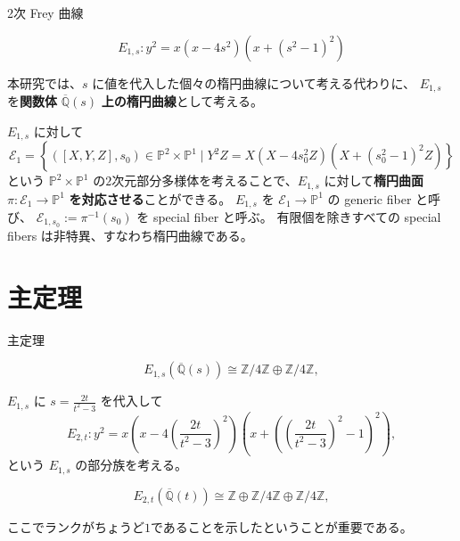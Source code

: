 \documentclass{classes/mybeamer}
\begin{document}
\begin{frame}{2次 Frey 曲線}
    \begin{eg*}
        \begin{equation*}
            E_{1,s}: y^{2} = x(x - 4s^{2})(x + (s^{2} - 1)^{2})
        \end{equation*}
    \end{eg*}
    本研究では、$s$ に値を代入した個々の楕円曲線について考える代わりに、 $E_{1,s}$ を\textbf{関数体} $\overline{\mathbb{Q}}(s)$ \textbf{上の楕円曲線}として考える。
    \vspace{1cm}

    $E_{1,s}$ に対して
    \begin{equation*}
        \mathcal{E}_{1} = \left\{ ([X,Y,Z],s_0) \in \mathbb{P}^{2} \times \mathbb{P}^{1} \mid Y^{2}Z = X(X - 4s_{0}^{2}Z)(X + (s_{0}^{2} - 1)^{2}Z) \right\}
    \end{equation*}
    という $\mathbb{P}^{2} \times \mathbb{P}^{1}$ の$2$次元部分多様体を考えることで、$E_{1,s}$ に対して\textbf{楕円曲面} $\pi: \mathcal{E}_{1}\to \mathbb{P}^{1}$ \textbf{を対応させる}ことができる。
    $E_{1,s}$ を $\mathcal{E}_{1} \to \mathbb{P}^{1}$ の generic fiber と呼び、 $\mathcal{E}_{1,s_0}:=\pi^{-1}(s_0)$ を special fiber と呼ぶ。
    有限個を除きすべての special fibers は非特異、すなわち楕円曲線である。
\end{frame}

\section{主定理}
\begin{frame}{主定理}
    \begin{proposition}[Y.]
        \begin{equation*}
            E_{1,s}(\overline{\mathbb{Q}}(s)) \cong \mathbb{Z} / 4 \mathbb{Z} \oplus \mathbb{Z} / 4 \mathbb{Z},
        \end{equation*}
    \end{proposition}
    \vspace{1em}
    
    $E_{1,s}$ に $s = \frac{2t}{t^{2} - 3}$ を代入して
    \begin{equation*}
        E_{2,t}: y^{2} = x \left(x - 4 \left(\frac{2t}{t^{2} - 3} \right)^{2} \right) \left(x + \left(\left(\frac{2t}{t^{2} - 3} \right)^{2} - 1 \right)^{2} \right),
    \end{equation*}
    という $E_{1,s}$ の部分族を考える。
    \begin{thm}[Y.]
        \begin{equation*}
            E_{2,t}(\overline{\mathbb{Q}}(t)) \cong \mathbb{Z} \oplus \mathbb{Z} / 4 \mathbb{Z} \oplus \mathbb{Z} / 4 \mathbb{Z},
        \end{equation*}
    \end{thm}
    ここでランクがちょうど$1$であることを示したということが重要である。
\end{frame}
\end{document}
